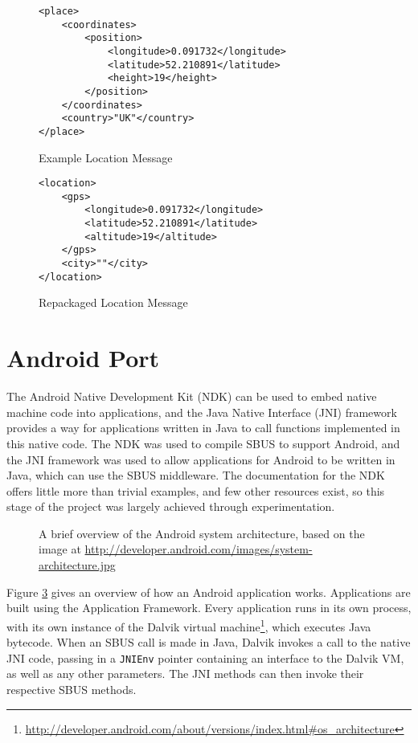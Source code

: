 \documentclass[12pt,twoside,notitlepage]{report}
\begin{document}
\begin{figure}
\begin{lstlisting}[style=xml]
<place>
	<coordinates>
		<position>
			<longitude>0.091732</longitude>
			<latitude>52.210891</latitude>
			<height>19</height>
		</position>
	</coordinates>
	<country>"UK"</country>
</place>
\end{lstlisting}
\caption{Example Location Message}
\label{fig:locationmessage}
\end{figure}

\begin{figure}
\begin{lstlisting}[style=xml]
<location>
	<gps>
		<longitude>0.091732</longitude>
		<latitude>52.210891</latitude>
		<altitude>19</altitude>
	</gps>
	<city>""</city>
</location>
\end{lstlisting}
\caption{Repackaged Location Message}
\label{fig:locationmessagerepack}
\end{figure}

\section{Android Port}

The Android Native Development Kit (NDK) can be used to embed native machine code into applications, and the Java Native Interface (JNI) framework provides a way for applications written in Java to call functions implemented in this native code.
The NDK was used to compile SBUS to support Android, and the JNI framework was used to allow applications for Android to be written in Java, which can use the SBUS middleware. 
The documentation for the NDK offers little more than trivial examples, and few other resources exist, so this stage of the project was largely achieved through experimentation. 

\begin{figure}[h]
\epsfxsize=8cm
\centerline{}
\caption[Android System Architecture]{A brief overview of the Android system architecture, based on the image at \url{http://developer.android.com/images/system-architecture.jpg}}
\label{fig:android_stack}
\end{figure}

Figure \ref{fig:android_stack} gives an overview of how an Android application works. 
Applications are built using the Application Framework. 
Every application runs in its own process, with its own instance of the Dalvik virtual machine\footnote{\url{http://developer.android.com/about/versions/index.html\#os_architecture}}, which executes Java bytecode. 
When an SBUS call is made in Java, Dalvik invokes a call to the native JNI code, passing in a {\tt JNIEnv} pointer containing an interface to the Dalvik VM, as well as any other parameters. 
The JNI methods can then invoke their respective SBUS methods.
\end{document}
